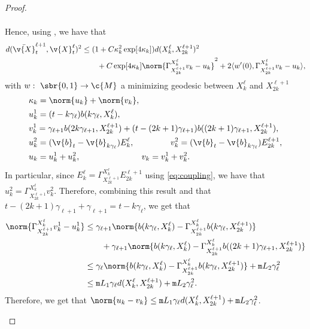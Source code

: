 \begin{proof}{}{}
\begin{enumerate}[wide, labelindent=0pt, label=(\alph*)]
\begin{align}
		      \end{align}
		      Hence, using , we have that \begin{align} \label{eq:upper_bound_distance_cheng} d(\bar{\v{X}}_{t}^{\ell+1}, \v{X}_{t}^\ell)^2 &\leq (1 +C \kappa_k^2 \exp[4 \kappa_k]) d(X_k^\ell,X_{2k}^{\ell+1})^2 \\ & \qquad + C \exp[4 \kappa_k] \norm{\Gamma_{X_{2k}^{\ell+1}}^{X_k^\ell} v_k - u_k}^2 + 2 \langle w'(0), \Gamma_{X_{2k}^{\ell+1}}^{X_k^\ell} v_k - u_k \rangle , \end{align} with $w: \ \sbr{0,1} \to \c{M}$ a minimizing geodesic between $X_k^\ell$ and $X_{2k}^{\ell+1}$ \begin{align}  & \kappa_k = \norm{u_k} + \norm{v_k} , \\ &u_k^1 = (t- k\gamma_\ell) b(k \gamma_\ell, X_k^\ell) , \\ &v_k^1 = \gamma_{\ell+1} b(2k \gamma_{\ell + 1}, X_{2k}^{\ell+1}) + (t - (2k+1) \gamma_{\ell+1}) b((2k+1) \gamma_{\ell + 1}, X_{2k}^{\ell+1}) , \\ &u_k^2 = (\v{b}_{t} - \v{b}_{k \gamma_\ell}) E_{k}^{\ell} , \qquad \quad \quad \ v_k^2 = (\v{b}_{t} - \v{b}_{k \gamma_\ell}) E_{2k}^{\ell+1} , \\ &u_k = u_k^1 + u_k^2 , \qquad \qquad \qquad \quad \ v_k = v_k^1 + v_k^2 .
		      \end{align}
		      In particular, since $E_k^\ell = \Gamma_{X_{2k}^{\ell+1}}^{X_{k}^\ell} E_{2k}^{\ell+1}$ using \eqref{eq:coupling}, we have that $u_k^2 = \Gamma_{X_{2k}^{\ell+1}}^{X_{k}^\ell} v_k^2$.
		      Therefore, combining this result and that $t- (2k+1)\gamma_{\ell+1} + \gamma_{\ell+1} = t - k \gamma_\ell$, we get that \begin{align} \norm{\Gamma_{X_{2k}^{\ell+1}}^{X_{k}^\ell} v_k^1 - u_k^1} & \leq \gamma_{\ell+1} \norm{b(k \gamma_\ell, X_k^\ell) - \Gamma_{X_{2k}^{\ell+1}}^{X_{k}^\ell} b(k \gamma_\ell, X_{2k}^{\ell+1})} \\ & \qquad + \gamma_{\ell+1} \norm{b(k \gamma_\ell, X_k^\ell) - \Gamma_{X_{2k}^{\ell+1}}^{X_{k}^\ell} b((2 k +1) \gamma_{\ell+1}, X_{2k}^{\ell+1})} \\ &\leq \gamma_{\ell} \norm{b(k \gamma_\ell, X_k^\ell) - \Gamma_{X_{2k}^{\ell+1}}^{X_{k}^\ell} b(k \gamma_\ell, X_{2k}^{\ell+1})} + \mathtt{m}{L}_2 \gamma_{\ell}^2 \\ &\leq \mathtt{m}{L}_1 \gamma_\ell d(X_k^\ell, X_{2k}^{\ell+1}) + \mathtt{m}{L}_2 \gamma_\ell^2 .
		      \end{align}
		      Therefore, we get that $\norm{u_k - v_k} \leq \mathtt{m}{L}_1 \gamma_\ell d(X_k^\ell, X_{2k}^{\ell+1}) + \mathtt{m}{L}_2 \gamma_\ell^2$.

\end{enumerate}
\end{proof}
